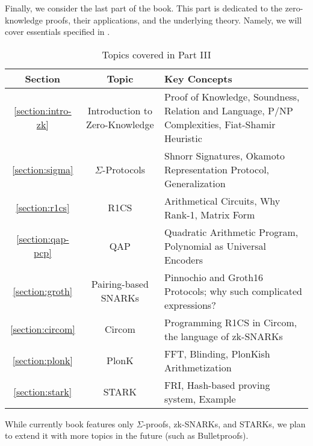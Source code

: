\documentclass[../../lecture-notes-148x210.tex]{subfiles}
\begin{document}
Finally, we consider the last part of the book. This part is dedicated to the
zero-knowledge proofs, their applications, and the underlying theory. Namely, we
will cover essentials specified in .

\begin{table}[H]
    \centering
    \begin{tabularx}{\textwidth}{|c|c|X|}
        \hline
        \rowcolor{purple!30}\textbf{Section} & \textbf{Topic} & \textbf{Key Concepts} \\
        \hline
        \rowcolor{purple!10}\ref{section:intro-zk} & Introduction to Zero-Knowledge & Proof of Knowledge, 
        Soundness, Relation and Language, P/NP Complexities, Fiat-Shamir Heuristic  \\
        \hline
        \rowcolor{purple!20}\ref{section:sigma} & $\Sigma$-Protocols &
        Shnorr Signatures, Okamoto Representation Protocol, Generalization \\
        \hline
        \rowcolor{purple!10}\ref{section:r1cs} & R1CS & Arithmetical Circuits, Why Rank-1, Matrix Form \\
        \hline
        \rowcolor{purple!20}\ref{section:qap-pcp} & QAP & Quadratic Arithmetic Program, Polynomial as Universal Encoders \\
        \hline
        \rowcolor{purple!10}\ref{section:groth} & Pairing-based SNARKs & Pinnochio and Groth16 Protocols; why such complicated expressions? \\
        \hline
        \rowcolor{purple!20}\ref{section:circom} & Circom & Programming R1CS in Circom, the language of zk-SNARKs \\
        \hline
        \rowcolor{purple!10}\ref{section:plonk} & PlonK & FFT, Blinding, PlonKish Arithmetization \\
        \hline
        \rowcolor{purple!20}\ref{section:stark} & STARK & FRI, Hash-based proving system, Example \\
    \end{tabularx}
    \caption{Topics covered in Part III}
    \label{tab:essentialls-3}
\end{table}

While currently book features only $\Sigma$-proofs, zk-SNARKs, and STARKs, we
plan to extend it with more topics in the future (such as Bulletproofs). 
\end{document}
